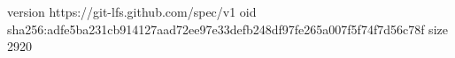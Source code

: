 version https://git-lfs.github.com/spec/v1
oid sha256:adfe5ba231cb914127aad72ee97e33defb248df97fe265a007f5f74f7d56c78f
size 2920
